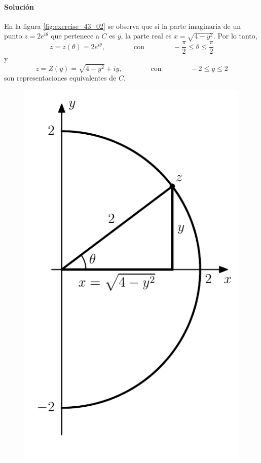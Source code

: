 \documentclass[a4paper]{report}
\begin{document}
\paragraph{Solución} En la figura \ref{fig:exercise_43_02} se observa que si la parte imaginaria de un punto \(z=2e^{i\theta}\) que pertenece a \(C\) es \(y\), la parte real es \(x=\sqrt{4-y^2}\). Por lo tanto,
\[
 z=z(\theta)=2e^{i\theta},
 \qquad\qquad\textrm{con}\qquad\qquad
 -\frac{\pi}{2}\leq\theta\leq\frac{\pi}{2} 
\]
y
\[
 z=Z(y)=\sqrt{4-y^2}+iy,
 \qquad\qquad\textrm{con}\qquad\qquad
 -2\leq y\leq2
\]
son representaciones equivalentes de \(C\). 
\begin{figure}[!htb]
  \begin{minipage}[c]{0.35\textwidth}
    \includegraphics[width=\textwidth]{figuras/exercise_43_02.pdf}

\end{minipage}
\end{figure}
\end{document}
